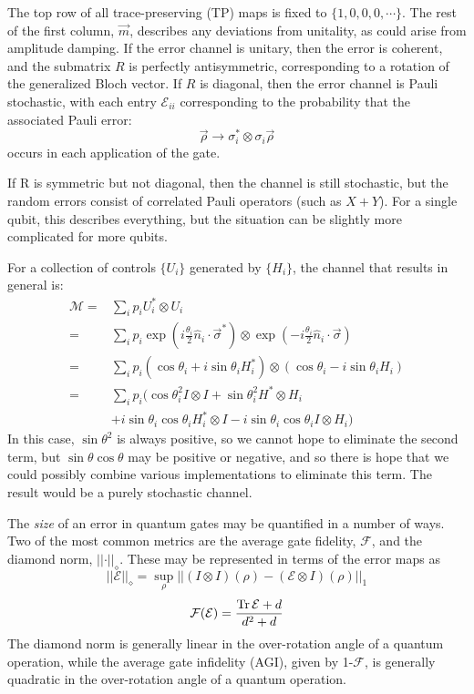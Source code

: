 \documentclass[aps,nofootinbib,pra,notitlepage,twocolumn]{revtex4-1}
\newcommand{\tr}{{\rm Tr\thinspace}}
\newcommand{\error}{\ensuremath{{\mathcal{E}}}}
\begin{document}
The top row of all trace-preserving (TP) maps is fixed to $\{1,0,0,0,\cdots\}$.  The rest of the first column, $\vec{m}$, describes any deviations from unitality, as could arise from amplitude damping. If the error channel is unitary, then the error is coherent, and the submatrix $R$ is perfectly antisymmetric, corresponding to a rotation of the generalized Bloch vector. If  $R$ is diagonal, then the error channel is Pauli stochastic, with each entry $\error_{ii}$ corresponding to the probability that the associated Pauli error:
\begin{equation}
\vec\rho \rightarrow \sigma_i^*\otimes\sigma_i\vec\rho
\end{equation}
 occurs in each application of the gate. 

 If R is symmetric but not diagonal, then the channel is still stochastic, but the random errors consist of correlated Pauli operators (such as $X+Y$). For a single qubit, this describes everything, but the situation can be slightly more complicated for more qubits. 

For a collection of controls $\{U_i\}$ generated by $\{H_i\}$, the channel that results in general is:
\begin{align}
	\mathcal{M} 
		=& \sum_i p_i U^*_i \otimes U_i \\
		=& \sum_i p_i \exp(i \frac{\theta_i}{2}\hat n_i \cdot \vec\sigma^*) \otimes \exp(-i \frac{\theta_i}{2} \hat n_i \cdot \vec\sigma) \\
		=& \sum_i p_i (\cos\theta_i + i \sin\theta_i H_i^*)\otimes(\cos\theta_i -i \sin\theta_i H_i) \\
		=& \sum_i p_i (\cos\theta_i^2 I\otimes I + \sin\theta_i^2 H^*\otimes H_i \\ & + i\sin\theta_i\cos\theta_i H_i^*\otimes I
								- i\sin\theta_i\cos\theta_i I\otimes H_i )
\end{align}
In this case, $\sin\theta^2$ is always positive, so we cannot hope to eliminate the second term, but $\sin\theta\cos\theta$ may be positive or negative, and so there is hope that we could possibly combine various implementations to eliminate this term. The result would be a purely stochastic channel. 


The \emph{size} of an error in quantum gates may  be quantified in a number of ways. Two of the most common metrics are the average gate fidelity, $\mathcal{F}$, and the diamond norm, $\vert\vert\cdot\vert\vert_\diamond$. These may be represented in terms of the error maps as
\begin{equation}
	\vert\vert \error \vert\vert_\diamond = \sup_\rho \vert \vert (I\otimes I)(\rho) - (\error \otimes I)(\rho) \vert\vert_1
\end{equation}
\begin{equation}
	\mathcal{F}(\error) = \frac{\tr{\error} + d}{d^2 + d}
\end{equation}
The diamond norm is generally linear in the over-rotation angle of a quantum operation, while the average gate infidelity (AGI), given by 1-$\mathcal{F}$, is generally quadratic in the over-rotation angle of a quantum operation. 
\end{document}
